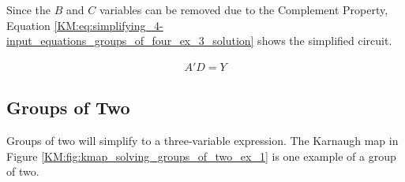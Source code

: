 Since the $ B $ and $ C $ variables can be removed due to the Complement Property, Equation \ref{KM:eq:simplifying_4-input_equations_groups_of_four_ex_3_solution} shows the simplified circuit. 

\begin{align}
  \label{KM:eq:simplifying_4-input_equations_groups_of_four_ex_3_solution}
  A'D = Y
\end{align}

\subsection{Groups of Two}
\label{KM:subsec:groups_of_2}

Groups of two will simplify to a three-variable expression. The Karnaugh map in Figure \ref{KM:fig:kmap_solving_groups_of_two_ex_1} is one example of a group of two. 

